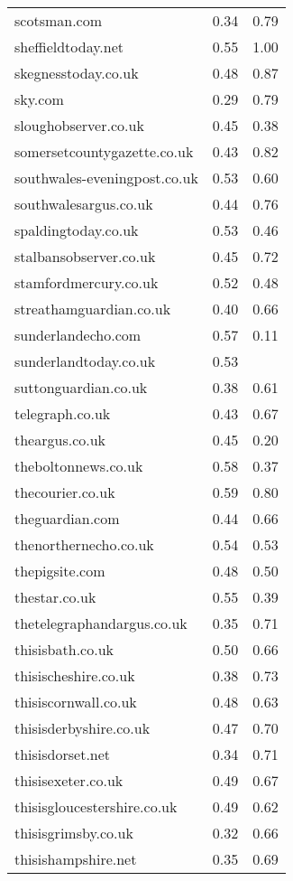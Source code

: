 \begin{longtable}{p{}p{}p{}}
  scotsman.com & 0.34 & 0.79 \\ 
  sheffieldtoday.net & 0.55 & 1.00 \\ 
  skegnesstoday.co.uk & 0.48 & 0.87 \\ 
  sky.com & 0.29 & 0.79 \\ 
  sloughobserver.co.uk & 0.45 & 0.38 \\ 
  somersetcountygazette.co.uk & 0.43 & 0.82 \\ 
  southwales-eveningpost.co.uk & 0.53 & 0.60 \\ 
  southwalesargus.co.uk & 0.44 & 0.76 \\ 
  spaldingtoday.co.uk & 0.53 & 0.46 \\ 
  stalbansobserver.co.uk & 0.45 & 0.72 \\ 
  stamfordmercury.co.uk & 0.52 & 0.48 \\ 
  streathamguardian.co.uk & 0.40 & 0.66 \\ 
  sunderlandecho.com & 0.57 & 0.11 \\ 
  sunderlandtoday.co.uk & 0.53 &  \\ 
  suttonguardian.co.uk & 0.38 & 0.61 \\ 
  telegraph.co.uk & 0.43 & 0.67 \\ 
  theargus.co.uk & 0.45 & 0.20 \\ 
  theboltonnews.co.uk & 0.58 & 0.37 \\ 
  thecourier.co.uk & 0.59 & 0.80 \\ 
  theguardian.com & 0.44 & 0.66 \\ 
  thenorthernecho.co.uk & 0.54 & 0.53 \\ 
  thepigsite.com & 0.48 & 0.50 \\ 
  thestar.co.uk & 0.55 & 0.39 \\ 
  thetelegraphandargus.co.uk & 0.35 & 0.71 \\ 
  thisisbath.co.uk & 0.50 & 0.66 \\ 
  thisischeshire.co.uk & 0.38 & 0.73 \\ 
  thisiscornwall.co.uk & 0.48 & 0.63 \\ 
  thisisderbyshire.co.uk & 0.47 & 0.70 \\ 
  thisisdorset.net & 0.34 & 0.71 \\ 
  thisisexeter.co.uk & 0.49 & 0.67 \\ 
  thisisgloucestershire.co.uk & 0.49 & 0.62 \\ 
  thisisgrimsby.co.uk & 0.32 & 0.66 \\ 
  thisishampshire.net & 0.35 & 0.69 \\ 

\end{longtable}
